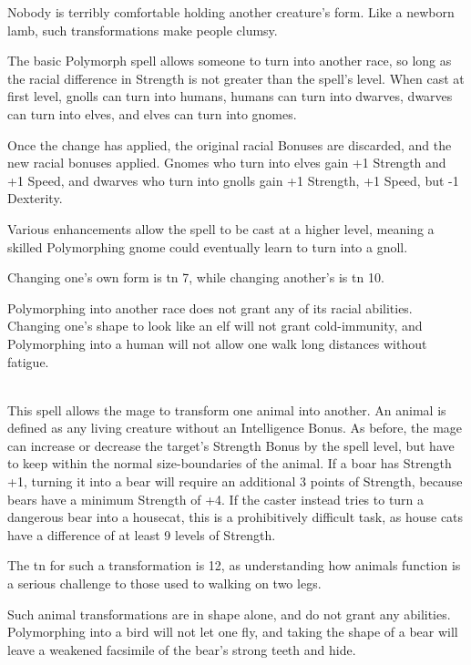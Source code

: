 \begin{multicols}{2}
Nobody is terribly comfortable holding another creature's form.  Like a newborn lamb, such transformations make people clumsy.

\spelllevel


The basic Polymorph spell allows someone to turn into another race, so long as the racial difference in Strength is not greater than the spell's level.
When cast at first level, gnolls can turn into humans, humans can turn into dwarves, dwarves can turn into elves, and elves can turn into gnomes.

Once the change has applied, the original racial Bonuses are discarded, and the new racial bonuses applied.
Gnomes who turn into elves gain +1 Strength and +1 Speed, and dwarves who turn into gnolls gain +1 Strength, +1 Speed, but -1 Dexterity.

Various enhancements allow the spell to be cast at a higher level, meaning a skilled Polymorphing gnome could eventually learn to turn into a gnoll.

Changing one's own form is \gls{tn} 7, while changing another's is \gls{tn} 10.

Polymorphing into another race does not grant any of its racial abilities.
Changing one's shape to look like an elf will not grant cold-immunity, and Polymorphing into a human will not allow one walk long distances without fatigue.

\\
This spell allows the mage to transform one animal into another.
An animal is defined as any living creature without an Intelligence Bonus.
As before, the mage can increase or decrease the target's Strength Bonus by the spell level,
but have to keep within the normal size-boundaries of the animal.
If a boar has Strength +1, turning it into a bear will require an additional 3 points of Strength, because bears have a minimum Strength of +4.
If the caster instead tries to turn a dangerous bear into a housecat, this is a prohibitively difficult task, as house cats have a difference of at least 9 levels of Strength.

The \gls{tn} for such a transformation is 12, as understanding how animals function is a serious challenge to those used to walking on two legs.

Such animal transformations are in shape alone, and do not grant any abilities.  Polymorphing into a bird will not let one fly, and taking the shape of a bear will leave a weakened facsimile of the bear's strong teeth and hide.


\end{multicols}
